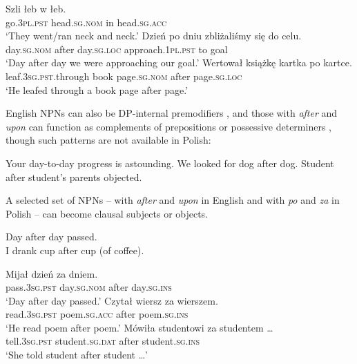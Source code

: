 \documentclass[output=paper]{langscibook}
\begin{document}
\ea\label{psk:ex:key:12345} \ea \gll \label{psk:ex:key:18}Szli łeb w łeb.\\
      go.\textsc{3pl.pst}  head.\textsc{sg.nom} in head.\textsc{sg.acc}\\
\glt     ‘They went/ran neck and neck.’
\ex \gll  Dzień          po     dniu            zbliżaliśmy się     do celu.\\
      day.\textsc{sg.nom} after day.\textsc{sg.loc} approach.\textsc{1pl.pst} to goal\\
\glt     ‘Day after day we were approaching our goal.’
\ex\gll  Wertował                  książkę kartka           po     kartce.\\
      leaf.\textsc{3sg.pst}.through book page.\textsc{sg.nom} after page.\textsc{sg.loc}\\
\glt     ‘He leafed through a book page after page.’\hfill\citep[249]{Dobaczewski2018}\z
\z

\noindent English NPNs can also be DP-internal premodifiers , and those with \textit{after} and \textit{upon} can function as complements of prepositions   or possessive determiners  \citep[19]{Jackendoff2008}, though such patterns are not available in Polish:

\ea \label{psk:ex:key:19}  \ea\label{psk:ex:key:19a} Your day-to-day progress is astounding.
\ex\label{psk:ex:key:19b} We looked for dog after dog.
\ex\label{psk:ex:key:19c} Student after student’s parents objected.
\z\z

\noindent A selected set of NPNs – with \textit{after} and \textit{upon} in English and with \textit{po} and \textit{za} in Polish – can become clausal subjects or objects.

\ea \label{psk:ex:key:20}  \ea Day after day passed.\\
\ex I drank cup after cup (of coffee).\\
\z \z

\ea \label{psk:ex:key:21}  \ea \gll Mijał dzień za dniem.\\
      pass.\textsc{3sg.pst} day.\textsc{sg.nom} after day.\textsc{sg.ins}\\
\glt      ‘Day after day passed.’
\ex \gll   Czytał wiersz za wierszem.\\
      read.\textsc{3sg.pst} poem.\textsc{sg.acc} after poem.\textsc{sg.ins}\\
\glt      ‘He read poem after poem.’
\ex \gll   Mówiła studentowi za studentem …\\
      tell.\textsc{3sg.pst} student.\textsc{sg.dat} after student.\textsc{sg.ins}\\
\glt      ‘She told student after student …’\z
\z
\end{document}
